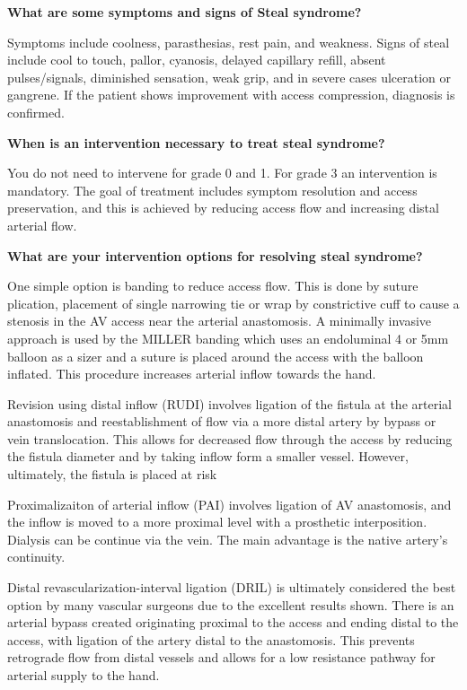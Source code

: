 \documentclass[
]{book}
\begin{document}
\textbf{What are some symptoms and signs of Steal syndrome?}

Symptoms include coolness, parasthesias, rest pain, and weakness. Signs
of steal include cool to touch, pallor, cyanosis, delayed capillary
refill, absent pulses/signals, diminished sensation, weak grip, and in
severe cases ulceration or gangrene. If the patient shows improvement
with access compression, diagnosis is confirmed.

\textbf{When is an intervention necessary to treat steal syndrome?}

You do not need to intervene for grade 0 and 1. For grade 3 an
intervention is mandatory. The goal of treatment includes symptom
resolution and access preservation, and this is achieved by reducing
access flow and increasing distal arterial flow.

\textbf{What are your intervention options for resolving steal syndrome?}

One simple option is banding to reduce access flow. This is done by
suture plication, placement of single narrowing tie or wrap by
constrictive cuff to cause a stenosis in the AV access near the arterial
anastomosis. A minimally invasive approach is used by the MILLER banding
which uses an endoluminal 4 or 5mm balloon as a sizer and a suture is
placed around the access with the balloon inflated. This procedure
increases arterial inflow towards the hand.

Revision using distal inflow (RUDI) involves ligation of the fistula at
the arterial anastomosis and reestablishment of flow via a more distal
artery by bypass or vein translocation. This allows for decreased flow
through the access by reducing the fistula diameter and by taking inflow
form a smaller vessel. However, ultimately, the fistula is placed at
risk

Proximalizaiton of arterial inflow (PAI) involves ligation of AV
anastomosis, and the inflow is moved to a more proximal level with a
prosthetic interposition. Dialysis can be continue via the vein. The
main advantage is the native artery's continuity.

Distal revascularization-interval ligation (DRIL) is ultimately
considered the best option by many vascular surgeons due to the
excellent results shown. There is an arterial bypass created originating
proximal to the access and ending distal to the access, with ligation of
the artery distal to the anastomosis. This prevents retrograde flow from
distal vessels and allows for a low resistance pathway for arterial
supply to the hand.
\end{document}
